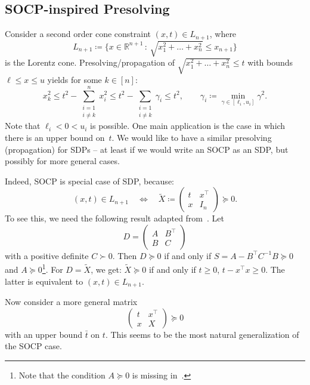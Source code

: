 \documentclass[10pt, a4paper]{article}
\newcommand{\suchthat}{\,:\,}
\newcommand{\define}{\coloneqq}
\newcommand{\T}{^{\top}}
\newcommand{\R}{\mathds{R}}
\begin{document}


\subsection{SOCP-inspired Presolving}

Consider a second order cone constraint $(x,t) \in L_{n+1}$, where
\[
  L_{n+1} \define \Big\{x \in \R^{n+1} \suchthat \sqrt{x_1^2 + \dots + x_n^2}
  \leq x_{n+1}\Big\}
\]
is the Lorentz cone.  Presolving/propagation of
$\sqrt{x_1^2 + \dots + x_n^2} \leq t$ with bounds $\ell \leq x \leq u$
yields for some $k \in [n]$:
\begin{equation}\label{eq:SOCPpre}
  x_k^2 \leq t^2 - \sum_{\substack{i=1\\ i \neq k}}^n x_i^2 \leq t^2 -
  \sum_{\substack{i=1\\ i \neq k}} \gamma_i \leq t^2,\qquad
  \gamma_i \define \min_{\gamma \in [\ell_i, u_i]} \gamma^2.
\end{equation}
Note that $\ell_i < 0 < u_i$ is possible. One main application is the case
in which there is an upper bound on~$t$. We would like to have a similar
presolving (propagation) for SDPs -- at least if we would write an SOCP as
an SDP, but possibly for more general cases.

Indeed, SOCP is special case of SDP, because:
\[
  (x,t) \in L_{n+1} \quad\Leftrightarrow\quad
  \tilde{X} \define
  \begin{pmatrix}
    t & x\T\\
    x & I_n
  \end{pmatrix}
  \succeq 0.
\]
To see this, we need the following result adapted
from~\cite[Section~A.5.5]{BoyV09}. Let
\[
  D = \begin{pmatrix}
    A & B\T\\
    B & C
  \end{pmatrix}
\]
with a positive definite $C \succ 0$. Then $D \succeq 0$ if and only if
$S = A - B\T C^{-1} B \succeq 0$ and $A \succeq 0$\footnote{Note that the
  condition $A \succeq 0$ is missing in~\cite{BoyV09}.}. For $D = \tilde{X}$, we
get: $\tilde{X} \succeq 0$ if and only if $t \geq 0$, $t - x\T x \geq
0$. The latter is equivalent to $(x,t) \in L_{n+1}$.

Now consider a more general matrix
\begin{equation}\label{eq:GeneralPSD}
  \begin{pmatrix}
    t & x\T\\
    x & X
  \end{pmatrix}
  \succeq 0
\end{equation}
with an upper bound $\bar{t}$ on $t$. This seems to be the most natural
generalization of the SOCP case.
\end{document}
